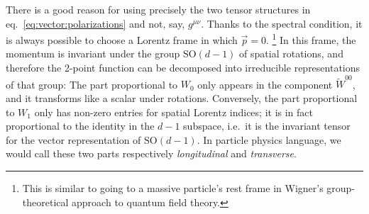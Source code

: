 \documentclass[a4paper,12pt]{article}
\newcommand{\SO}{\text{SO}}
\numberwithin{equation}{section}
\begin{document}
There is a good reason for using precisely the two tensor structures in eq.~\eqref{eq:vector:polarizations} and not, say, $g^{\mu\nu}$. Thanks to the spectral condition, it is always possible to choose a Lorentz frame in which $\vec{p} = 0$.%
%
\footnote{This is similar to going to a massive particle's rest frame in Wigner's group-theoretical approach to quantum field theory.}
%
In this frame, the momentum is invariant under the group $\SO(d-1)$ of spatial rotations, and therefore the 2-point function can be decomposed into irreducible representations of that group: The part proportional to $W_0$ only appears in the component $\widetilde{W}^{00}$, and it transforms like a scalar under rotations. Conversely, the part proportional to $W_1$ only has non-zero entries for spatial Lorentz indices; it is in fact proportional to the identity in the $d-1$ subspace, i.e.~it is the invariant tensor for the vector representation of $\SO(d-1)$.
In particle physics language, we would call these two parts respectively \emph{longitudinal} and \emph{transverse}.
\end{document}
